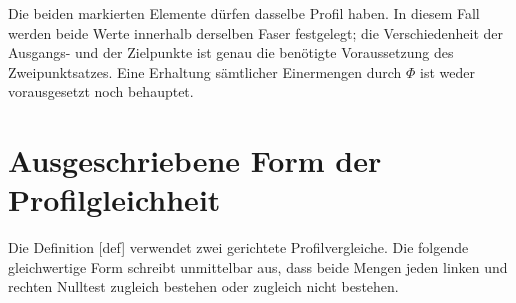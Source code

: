 \begin{tabproofsplitwide}
\closeproofpartwide
\end{tabproofsplitwide}

Die beiden markierten Elemente dürfen dasselbe Profil haben. In diesem
Fall werden beide Werte innerhalb derselben Faser festgelegt; die
Verschiedenheit der Ausgangs- und der Zielpunkte ist genau die benötigte
Voraussetzung des Zweipunktsatzes. Eine Erhaltung sämtlicher Einermengen
durch \(\Phi\) ist weder vorausgesetzt noch behauptet.

\section{Ausgeschriebene Form der Profilgleichheit}

Die Definition [def]
verwendet zwei gerichtete Profilvergleiche. Die folgende gleichwertige
Form schreibt unmittelbar aus, dass beide Mengen jeden linken und
rechten Nulltest zugleich bestehen oder zugleich nicht bestehen.

